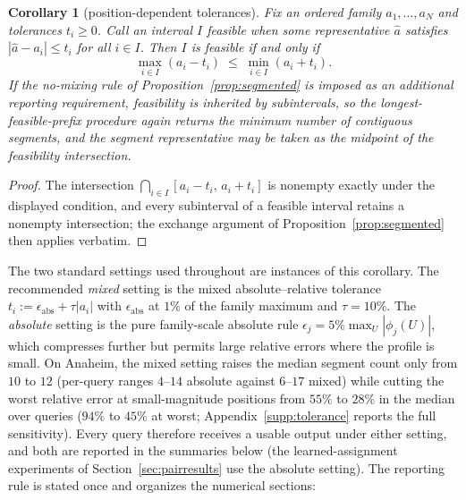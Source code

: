 \documentclass[a4paper,fleqn]{cas-sc}
\newtheorem{corollary}[theorem]{Corollary}
\begin{document}
\begin{corollary}[position-dependent tolerances]\label{cor:mixedtol}
Fix an ordered family $a_1,\ldots,a_N$ and tolerances $t_i\ge0$. Call
an interval $I$ feasible when some representative $\hat a$ satisfies
$|\hat a-a_i|\le t_i$ for all $i\in I$. Then $I$ is feasible if and
only if
\[
\max_{i\in I}(a_i-t_i)\;\le\;\min_{i\in I}(a_i+t_i).
\]
If the no-mixing rule of Proposition~\ref{prop:segmented} is imposed
as an additional reporting requirement, feasibility is inherited by
subintervals, so the longest-feasible-prefix procedure again returns
the minimum number of contiguous segments, and the segment
representative may be taken as the midpoint of the feasibility
intersection.
\end{corollary}
\begin{proof}
The intersection $\bigcap_{i\in I}[a_i-t_i,\,a_i+t_i]$ is nonempty
exactly under the displayed condition, and every subinterval of a
feasible interval retains a nonempty intersection; the exchange
argument of Proposition~\ref{prop:segmented} then applies verbatim.
\end{proof}
The two standard settings used throughout are instances of this
corollary. The recommended \emph{mixed} setting is the mixed
absolute--relative tolerance
$t_i:=\epsilon_{\mathrm{abs}}+\tau|a_i|$ with
$\epsilon_{\mathrm{abs}}$ at $1\%$ of the family maximum and
$\tau=10\%$. The \emph{absolute} setting is the pure
family-scale absolute rule $\epsilon_j=5\%\max_U|\phi_j(U)|$, which
compresses further but permits large relative errors where the profile
is small. On Anaheim, the mixed setting raises the median segment
count only from $10$ to $12$ (per-query ranges $4$--$14$ absolute
against $6$--$17$ mixed) while cutting the worst relative error at
small-magnitude positions from $55\%$ to $28\%$ in the median over
queries ($94\%$ to $45\%$ at worst; Appendix~\ref{supp:tolerance}
reports the full sensitivity).
Every query therefore receives a usable output under either setting,
and both are reported in the summaries below (the learned-assignment
experiments of Section~\ref{sec:pairresults} use the absolute setting).
The reporting rule is stated once and organizes the numerical sections:

\medskip
\noindent{}
\medskip
\end{document}
